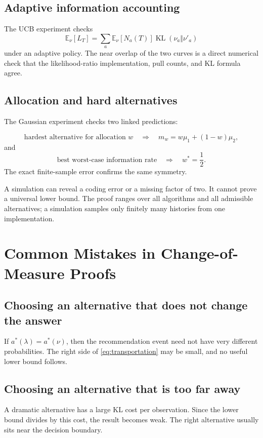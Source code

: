 \documentclass[en,nofont,11pt]{elegantbook}
\newcommand{\E}{\mathbb{E}}
\newcommand{\KL}{\operatorname{KL}}
\begin{document}
\section{Adaptive information accounting}

The UCB experiment checks
\[
\E_\nu[L_T]
=
\sum_a\E_\nu[N_a(T)]\KL(\nu_a\Vert\nu'_a)
\]
under an adaptive policy. The near overlap of the two curves is a direct numerical check that the likelihood-ratio implementation, pull counts, and KL formula agree.

\section{Allocation and hard alternatives}

The Gaussian experiment checks two linked predictions:

\[
\text{hardest alternative for allocation }w
\quad\Longrightarrow\quad
m_w=w\mu_1+(1-w)\mu_2,
\]
and
\[
\text{best worst-case information rate}
\quad\Longrightarrow\quad
w^*=\frac12.
\]
The exact finite-sample error confirms the same symmetry.

\begin{thinkbox}
A simulation can reveal a coding error or a missing factor of two. It cannot prove a universal lower bound. The proof ranges over all algorithms and all admissible alternatives; a simulation samples only finitely many histories from one implementation.
\end{thinkbox}

\chapter{Common Mistakes in Change-of-Measure Proofs}

\section{Choosing an alternative that does not change the answer}

If $a^*(\lambda)=a^*(\nu)$, then the recommendation event need not have very different probabilities. The right side of \eqref{eq:transportation} may be small, and no useful lower bound follows.

\section{Choosing an alternative that is too far away}

A dramatic alternative has a large KL cost per observation. Since the lower bound divides by this cost, the result becomes weak. The right alternative usually sits near the decision boundary.
\end{document}
